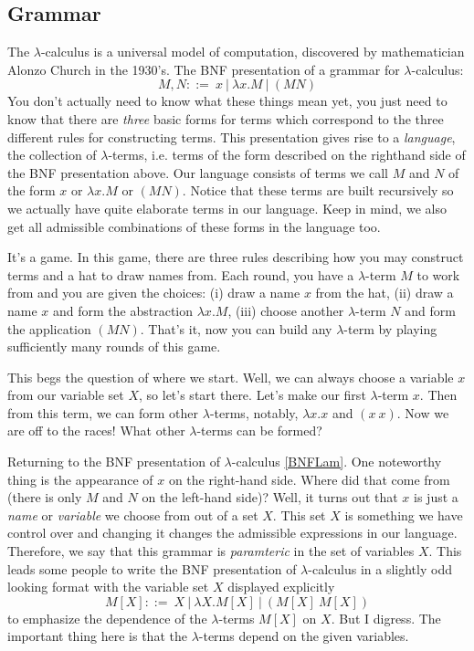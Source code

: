 \documentclass[12pt]{article}
\numberwithin{equation}{section}
\begin{document}
\subsection{Grammar}
The $\lambda$-calculus is a universal model of computation, discovered by mathematician Alonzo Church in the 1930's. The BNF presentation of a grammar for $\lambda$-calculus:
\begin{equation} \label{BNFLam}
M, N ::= \ x \ | \ \lambda x.M \ | \ (M N)
\end{equation}
You don't actually need to know what these things mean yet, you just need to know that there are \emph{three} basic forms for terms which correspond to the three different rules for constructing terms. This presentation gives rise to a \emph{language}, the collection of $\lambda$-terms,  i.e. terms of the form described on the righthand side of the BNF presentation above. Our language consists of terms we call $M$ and $N$ of the form $x$ or $\lambda x. M$ or $(M N)$. Notice that these terms are built recursively so we actually have quite elaborate terms in our language. Keep in mind, we also get all admissible combinations of these forms in the language too.%

It's a game. In this game, there are three rules describing how you may construct terms and a hat to draw names from. Each round, you have a $\lambda$-term $M$ to work from and you are given the choices: (i) draw a name $x$ from the hat, (ii) draw a name $x$ and form the abstraction $\lambda x. M$, (iii) choose another $\lambda$-term $N$ and form the application $(M N)$. That's it, now you can build any $\lambda$-term by playing sufficiently many rounds of this game.

This begs the question of where we start. Well, we can always choose a variable $x$ from our variable set $X$, so let's start there. Let's make our first $\lambda$-term $x$. Then from this term, we can form other $\lambda$-terms, notably, $\lambda x. x$ and $(x \ x)$. Now we are off to the races! What other $\lambda$-terms can be formed?

Returning to the BNF presentation of $\lambda$-calculus \eqref{BNFLam}. One noteworthy thing is the appearance of $x$ on the right-hand side. Where did that come from (there is only $M$ and $N$ on the left-hand side)? Well, it turns out that $x$ is just a \emph{name} or \emph{variable} we choose from out of a set $X$. This set $X$ is something we have control over and changing it changes the admissible expressions in our language. Therefore, we say that this grammar is \emph{paramteric} in the set of variables $X$. This leads some people to write the BNF presentation of $\lambda$-calculus in a slightly odd looking format with the variable set $X$ displayed explicitly
\[ M[X] ::= \ X \ | \ \lambda X.M[X] \ | \ (M[X] \  M[X]) \]
to emphasize the dependence of the $\lambda$-terms $M[X]$ on $X$. But I digress. The important thing here is that the $\lambda$-terms depend on the given variables.
\end{document}
